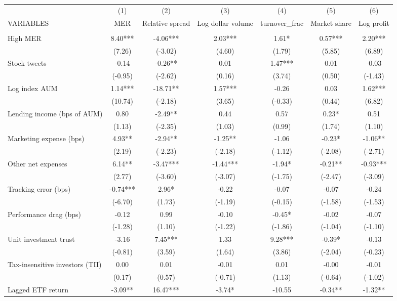\documentclass[]{article}
\begin{document}
\begin{tabular}{lcccccc} \hline
 & (1) & (2) & (3) & (4) & (5) & (6) \\
VARIABLES & MER & Relative spread & Log dollar volume & turnover\_frac & Market share & Log profit \\ \hline
 &  &  &  &  &  &  \\
High MER & 8.40*** & -4.06*** & 2.03*** & 1.61* & 0.57*** & 2.20*** \\
 & (7.26) & (-3.02) & (4.60) & (1.79) & (5.85) & (6.89) \\
Stock tweets & -0.14 & -0.26** & 0.01 & 1.47*** & 0.01 & -0.03 \\
 & (-0.95) & (-2.62) & (0.16) & (3.74) & (0.50) & (-1.43) \\
Log index AUM & 1.14*** & -18.71** & 1.57*** & -0.26 & 0.03 & 1.62*** \\
 & (10.74) & (-2.18) & (3.65) & (-0.33) & (0.44) & (6.82) \\
Lending income (bps of AUM) & 0.80 & -2.49** & 0.44 & 0.57 & 0.23* & 0.51 \\
 & (1.13) & (-2.35) & (1.03) & (0.99) & (1.74) & (1.10) \\
Marketing expense (bps) & 4.93** & -2.94** & -1.25** & -1.06 & -0.23* & -1.06** \\
 & (2.19) & (-2.23) & (-2.18) & (-1.12) & (-2.08) & (-2.71) \\
Other net expenses & 6.14** & -3.47*** & -1.44*** & -1.94* & -0.21** & -0.93*** \\
 & (2.77) & (-3.60) & (-3.07) & (-1.75) & (-2.47) & (-3.09) \\
Tracking error (bps) & -0.74*** & 2.96* & -0.22 & -0.07 & -0.07 & -0.24 \\
 & (-6.70) & (1.73) & (-1.19) & (-0.15) & (-1.58) & (-1.53) \\
Performance drag (bps) & -0.12 & 0.99 & -0.10 & -0.45* & -0.02 & -0.07 \\
 & (-1.28) & (1.10) & (-1.22) & (-1.86) & (-1.04) & (-1.10) \\
Unit investment trust & -3.16 & 7.45*** & 1.33 & 9.28*** & -0.39* & -0.13 \\
 & (-0.81) & (3.59) & (1.64) & (3.86) & (-2.04) & (-0.23) \\
Tax-insensitive investors (TII) & 0.00 & 0.01 & -0.01 & 0.01 & -0.00 & -0.01 \\
 & (0.17) & (0.57) & (-0.71) & (1.13) & (-0.64) & (-1.02) \\
Lagged ETF return & -3.09** & 16.47*** & -3.74* & -10.55 & -0.34** & -1.32** \\

\end{tabular}
\end{document}
